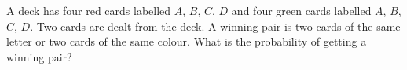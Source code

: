 A deck has four red cards labelled $A$, $B$, $C$, $D$ and four green cards labelled $A$, $B$, $C$, $D$. Two cards are dealt from the deck. A winning pair is two cards of the same letter or two cards of the same colour. What is the probability of getting a winning pair?
